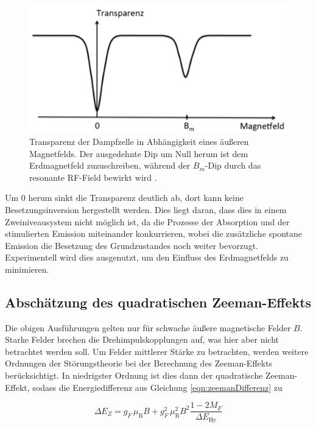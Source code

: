   \begin{figure}
    \centering
    \includegraphics[width=\textwidth]{pictures/transparenz.png}
    \caption{Transparenz der Dampfzelle in Abhängigkeit eines äußeren Magnetfelds. Der ausgedehnte Dip um Null herum ist dem Erdmagnetfeld zuzuschreiben, während der $B_m$-Dip durch das resonante RF-Field bewirkt wird \cite{VersuchsanleitungAlt}.}
    \label{fig:transparenz}
  \end{figure}

  Um 0 herum sinkt die Transparenz deutlich ab, dort kann keine Besetzungsinversion hergestellt werden. Dies liegt daran, dass dies in einem Zweiniveausystem nicht möglich ist, da die Prozesse der Absorption und der stimulierten Emission miteinander konkurrieren, wobei die zusätzliche spontane Emission die Besetzung des Grundzustandes noch weiter bevorzugt. Experimentell wird dies ausgenutzt, um den Einfluss des Erdmagnetfelds zu minimieren.

  \subsection{Abschätzung des quadratischen Zeeman-Effekts}
  \label{subsec:quadratischerZeeman}

  Die obigen Ausführungen gelten nur für schwache äußere magnetische Felder $B$.
  Starke Felder brechen die Drehimpulskopplungen auf, was hier aber nicht betrachtet werden soll.
  Um Felder mittlerer Stärke zu betrachten, werden weitere Ordnungen der Störungstheorie bei der Berechnung des Zeeman-Effekts berücksichtigt. In niedrigster Ordnung ist dies dann der quadratische Zeeman-Effekt, sodass die Energiedifferenz aus Gleichung \eqref{eqn:zeemanDifferenz} zu

  \begin{equation}
    \Delta E_Z = g_F \, \mu_{\text{B}} B + g_F^2 \, \mu_{\text{B}}^2 B^2 \frac{1-2M_F}{\Delta E_{\text{Hy}}}
    \label{eqn:zeemanDifferenzQuadratisch}
  \end{equation}

